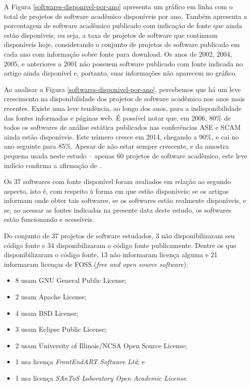 A Figura \ref{softwares-disponivel-por-ano} apresenta 
um gráfico em linha com o total de projetos de software acadêmico disponíveis por ano.
Também apresenta a porcentagem de software acadêmico publicado com indicação de fonte que ainda estão
disponíveis, ou seja, a taxa de projetos de software que continuam
disponíveis hoje, considerando o conjunto de projetos de software publicado em cada ano 
com informação sobre fonte para download. 
Os anos de 2002, 2004, 2005, e anteriores a 2001 não possuem software publicado
com fonte indicada no artigo ainda disponível e, portanto,
suas informações não aparecem no gráfico.

Ao analisar a Figura \ref{softwares-disponivel-por-ano},
percebemos que há um leve crescimento na disponibilidade
dos projetos de software acadêmico  nos anos mais recentes.
%
Existe uma leve tendência, ao longo dos anos,  
para a indisponibilidade das fontes informadas e páginas web.
É possível notar que, em 2006, 80\% de todos os
softwares de análise estática publicados nas conferências ASE e SCAM ainda estão disponíveis.
Este número cresce em 2014, chegando a 90\%, e cai no ano seguinte para 85\%.
Apesar de não estar sempre crescente, e da  amostra pequena usada neste estudo 
-- apenas 60 projetos de software acadêmico,
este leve indício confirma a afirmação de .

Os 37 softwares com fonte disponível foram avaliados em relação ao segundo
aspecto, isto é, com respeito à forma em que estão disponíveis:
se os artigos informam onde obter tais softwares, se os softwares estão realmente disponíveis, e 
se, ao acessar as fontes indicadas na presente data deste estudo, os softwares estão funcionando e
acessíveis.

Do conjunto de 37 projetos de software estudados, %
3 não disponibilizaram seu código fonte e  %
34 disponibilizaram o código fonte publicamente.
Dentre os que disponibilizaram o código fonte, 13 não informaram licença alguma
e 21 informaram licenças de FOSS ({\it free and open source software}):

\begin{itemize}
  \item 8 usam GNU General Public License;
  \item 2 usam Apache License;
  \item 4 usam BSD License;
  \item 3 usam Eclipse Public License;
  \item 2 usam University of Illinois/NCSA Open Source License;
  \item 1 usa licença {\it FrontEndART Software Ltd}; e
  \item 1 usa licença {\it SAnToS Laboratory Open Academic License}.
\end{itemize}

